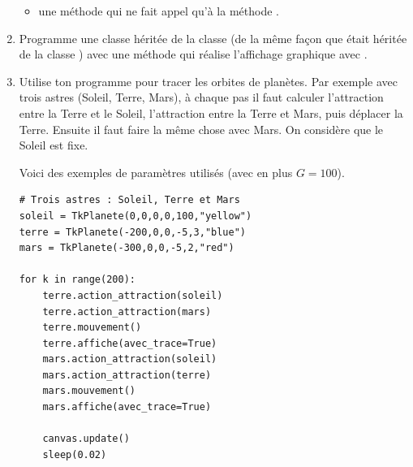 \documentclass[11pt,class=report,crop=false]{standalone}
\begin{document}
\begin{activite}
\begin{enumerate}
\begin{itemize}
    \item une méthode  qui ne fait appel qu'à la méthode   .
  \end{itemize}
  
  \item Programme une classe  héritée de la classe  (de la même façon que  était héritée de la classe ) avec une méthode  qui réalise l'affichage graphique avec .
 
 
 \item Utilise ton programme pour tracer les orbites de planètes. Par exemple avec trois astres (Soleil, Terre, Mars), à chaque pas il faut calculer l'attraction entre la Terre et le Soleil, l'attraction entre la Terre et Mars, puis déplacer la Terre. Ensuite il faut faire la même chose avec Mars. On considère que le Soleil est fixe.
 
 Voici des exemples de paramètres utilisés (avec en plus $G=100$).
 \begin{lstlisting}
# Trois astres : Soleil, Terre et Mars
soleil = TkPlanete(0,0,0,0,100,"yellow")
terre = TkPlanete(-200,0,0,-5,3,"blue")
mars = TkPlanete(-300,0,0,-5,2,"red")

for k in range(200):
    terre.action_attraction(soleil)
    terre.action_attraction(mars)
    terre.mouvement()
    terre.affiche(avec_trace=True)
    mars.action_attraction(soleil)
    mars.action_attraction(terre)
    mars.mouvement()
    mars.affiche(avec_trace=True)
    
    canvas.update()
    sleep(0.02)
\end{lstlisting}
 
\end{enumerate} 

\end{activite}
\end{document}

